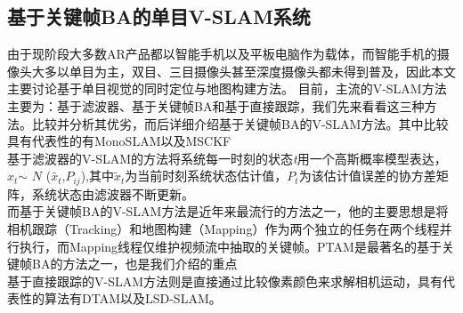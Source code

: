 \subsection{基于关键帧BA的单目V-SLAM系统}
由于现阶段大多数AR产品都以智能手机以及平板电脑作为载体，而智能手机的摄像头大多以单目为主，双目、三目摄像头甚至深度摄像头都未得到普及，因此本文主要讨论基于单目视觉的同时定位与地图构建方法。
目前，主流的V-SLAM方法主要为：基于滤波器、基于关键帧BA和基于直接跟踪，我们先来看看这三种方法。比较并分析其优劣，而后详细介绍基于关键帧BA的V-SLAM方法。其中比较具有代表性的有MonoSLAM以及MSCKF\\
基于滤波器的V-SLAM的方法将系统每一时刻的状态\textit{t}用一个高斯概率模型表达，$x_t$$\sim$ $\mathrm{\textit{N}}$ ($\tilde{x_{t}}$,$\mathrm{\textit{P}}_{ij}$),其中$\tilde{x}_t$为当前时刻系统状态估计值，$P_t$为该估计值误差的协方差矩阵，系统状态由滤波器不断更新。\\
而基于关键帧BA的V-SLAM方法\cite{TriggsB.HartleyR.I.FitzgibbonA.W.2000}是近年来最流行的方法之一，他的主要思想是将相机跟踪（Tracking）和地图构建（Mapping）作为两个独立的任务在两个线程并行执行，而Mapping线程仅维护视频流中抽取的关键帧。PTAM是最著名的基于关键帧BA的方法之一，也是我们介绍的重点\\
基于直接跟踪的V-SLAM方法则是直接通过比较像素颜色来求解相机运动，具有代表性的算法有DTAM以及LSD-SLAM。